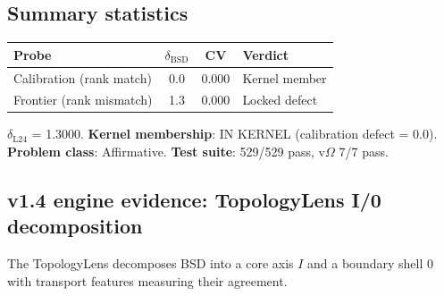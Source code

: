 \documentclass[11pt]{article}
\begin{document}
\subsection{Summary statistics}

\begin{center}
\begin{tabular}{lccl}
\hline
\textbf{Probe} & $\delta_{\mathrm{BSD}}$ & CV & \textbf{Verdict} \\
\hline
Calibration (rank match) & 0.0 & 0.000 & Kernel member \\
Frontier (rank mismatch) & 1.3 & 0.000 & Locked defect \\
\hline
\end{tabular}
\end{center}

\medskip
\noindent
\textbf{$\delta_{\mathrm{L24}}$} = 1.3000. \quad
\textbf{Kernel membership}: IN KERNEL (calibration defect = 0.0). \quad
\textbf{Problem class}: Affirmative. \quad
\textbf{Test suite}: 529/529 pass, v$\Omega$ 7/7 pass.

\subsection{v1.4 engine evidence: TopologyLens I/0 decomposition}
\label{sec:topology-lens}

The TopologyLens decomposes BSD into a core axis $I$ and a boundary shell $0$
with transport features measuring their agreement.
\end{document}
